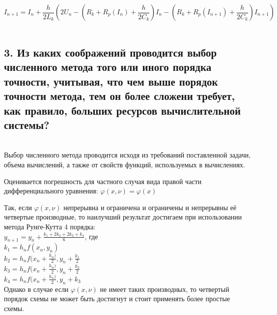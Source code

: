 \begin{equation}
    I_{n + 1} = I_{n} + \frac{h}{2L_{k}}(2U_{n} -  (R_{k} + R_{p}(I_{n}) + \frac{h}{2C_{k}})I_{n} - (R_{k} + R_{p}(I_{n + 1}) + \frac{h}{2C_{k}})I_{n+1})
\end{equation}\\

\subsection*{3. Из каких соображений проводится выбор численного метода того или иного порядка точности, учитывая, что чем выше порядок точности метода, тем он более сложени требует, как правило, больших ресурсов вычислительной системы?}\\

Выбор численного метода проводится исходя из требований поставленной задачи, объема вычислений, а также от свойств функций, используемых в вычислениях.

Оценивается погрешность для частного случая вида правой части дифференциального уравнения: $\varphi (x, \nu) = \varphi(x)$

Так, если $\varphi (x, \nu)$ непрерывна и ограничена и ограничены и непрерывны её четвертые производные, то наилучший результат достигаем при использовании метода Рунге-Кутта 4 порядка:\\

$y_{n + 1} = y_{n} + \frac{k_{1} + 2k_{2} + 2k_{3} + k_{4}}{6}$, где\\

$k_{1} = h_{n} f(x_{n}, y_{n})$\\
\indent $k_{2} = h_{n}f(x_{n} + \frac{h_{n})}{2}, y_{n} + \frac{k_{1}}{2}$\\
\indent $k_{3} = h_{n}f(x_{n} + \frac{h_{n})}{2}, y_{n} + \frac{k_{2}}{2}$\\
\indent $k_{4} = h_{n}f(x_{n} + \frac{h_{n})}{2}, y_{n} + k_{3}$\\

Однако в случае если $\varphi (x, \nu)$ не имеет таких производных, то четвертый порядок схемы не может быть достигнут и стоит применять более простые схемы.
